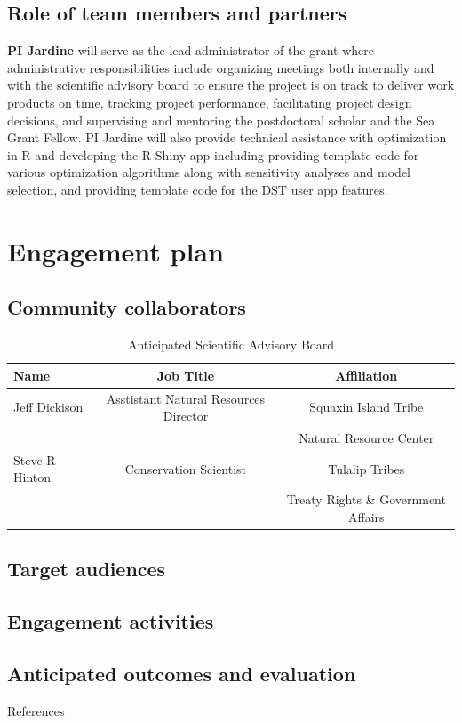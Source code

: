 \documentclass[12pt]{elsarticle}
\begin{document}
\subsection{Role of team members and partners}
\textbf{PI Jardine} will serve as the lead administrator of the grant where administrative responsibilities include organizing meetings both internally and with the scientific advisory board to ensure the project is on track to deliver work products on time, tracking project performance, facilitating project design decisions, and supervising and mentoring the postdoctoral scholar and the Sea Grant Fellow.  PI Jardine will also provide technical assistance with optimization in R and developing the R Shiny app including providing template code for various optimization algorithms along with sensitivity analyses and model selection, and providing template code for the DST user app features.\\


%
\section{Engagement plan}
\subsection{Community collaborators} 

\begin{table}[h]
\caption{Anticipated Scientific Advisory Board \label{tab:sab}}
\centering
\begin{tabular}{lcc}\hline
 Name & Job Title & Affiliation  \\\hline
Jeff Dickison& Asstistant Natural Resources Director &  Squaxin Island Tribe\\
& & Natural Resource Center\\
\rowcolor[gray]{.9} Steve R Hinton &  Conservation Scientist&  Tulalip Tribes  \\
\rowcolor[gray]{.9}& &Treaty Rights \& Government Affairs\\\hline
\end{tabular}
\end{table}


\subsection{Target audiences}
\subsection{Engagement activities}
\subsection{Anticipated outcomes and evaluation}

\clearpage
\large References\\
\normalsize

\end{document}
